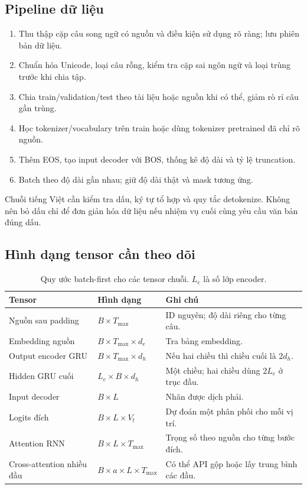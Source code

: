 \documentclass[11pt,a4paper]{article}
\numberwithin{equation}{section}
\begin{document}
\subsection{Pipeline dữ liệu}
\begin{enumerate}
\item Thu thập cặp câu song ngữ có nguồn và điều kiện sử dụng rõ ràng; lưu phiên bản dữ liệu.
\item Chuẩn hóa Unicode, loại câu rỗng, kiểm tra cặp sai ngôn ngữ và loại trùng trước khi chia tập.
\item Chia train/validation/test theo tài liệu hoặc nguồn khi có thể, giảm rò rỉ câu gần trùng.
\item Học tokenizer/vocabulary trên train hoặc dùng tokenizer pretrained đã chỉ rõ nguồn.
\item Thêm EOS, tạo input decoder với BOS, thống kê độ dài và tỷ lệ truncation.
\item Batch theo độ dài gần nhau; giữ độ dài thật và mask tương ứng.
\end{enumerate}
Chuỗi tiếng Việt cần kiểm tra dấu, ký tự tổ hợp và quy tắc detokenize. Không nên bỏ dấu chỉ để đơn giản hóa dữ liệu nếu nhiệm vụ cuối cùng yêu cầu văn bản đúng dấu.

\subsection{Hình dạng tensor cần theo dõi}
\begin{table}[H]
\centering\small
\begin{tabularx}{\linewidth}{@{}p{4.2cm}p{3.3cm}Y@{}}
\toprule{}Tensor & Hình dạng & Ghi chú\\\midrule
Nguồn sau padding & $B\times T_{\max}$ & ID nguyên; độ dài riêng cho từng câu.\\
Embedding nguồn & $B\times T_{\max}\times d_e$ & Tra bảng embedding.\\
Output encoder GRU & $B\times T_{\max}\times d_h$ & Nếu hai chiều thì chiều cuối là $2d_h$.\\
Hidden GRU cuối & $L_e\times B\times d_h$ & Một chiều; hai chiều dùng $2L_e$ ở trục đầu.\\
Input decoder & $B\times L$ & Nhãn được dịch phải.\\
Logits đích & $B\times L\times V_t$ & Dự đoán một phân phối cho mỗi vị trí.\\
Attention RNN & $B\times L\times T_{\max}$ & Trọng số theo nguồn cho từng bước đích.\\
Cross-attention nhiều đầu & $B\times a\times L\times T_{\max}$ & Có thể API gộp hoặc lấy trung bình các đầu.\\
\bottomrule
\end{tabularx}
\caption{Quy ước batch-first cho các tensor chuỗi. $L_e$ là số lớp encoder.}
\end{table}
\end{document}
